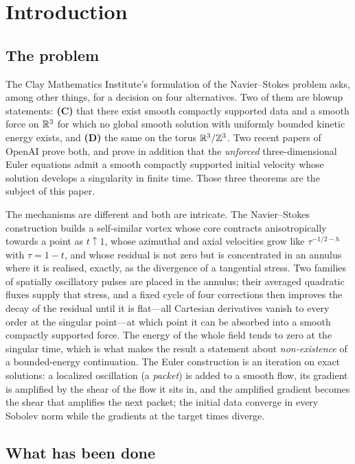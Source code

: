 \section{Introduction}
\label{sec:intro}

\subsection{The problem}

The Clay Mathematics Institute's formulation of the Navier--Stokes problem
\cite{clay} asks, among other things, for a decision on four alternatives. Two of them are
blowup statements: \textbf{(C)} that there exist smooth compactly supported data and a
smooth force on $\mathbb{R}^3$ for which no global smooth solution with uniformly bounded kinetic
energy exists, and \textbf{(D)} the same on the torus $\mathbb{R}^3/\mathbb{Z}^3$. Two recent papers of
OpenAI \cite{ns-paper,euler-paper} prove both, and prove in addition that the
\emph{unforced} three-dimensional Euler equations admit a smooth compactly supported
initial velocity whose solution develops a singularity in finite time. Those three
theorems are the subject of this paper.

The mechanisms are different and both are intricate. The Navier--Stokes construction builds
a self-similar vortex whose core contracts anisotropically towards a point as $t\uparrow1$,
whose azimuthal and axial velocities grow like $\tau^{-1/2-h}$ with $\tau=1-t$, and whose
residual is not zero but is concentrated in an annulus where it is realised, exactly, as
the divergence of a tangential stress. Two families of spatially oscillatory pulses are
placed in the annulus; their averaged quadratic fluxes supply that stress, and a fixed
cycle of four corrections then improves the decay of the residual until it is flat---all
Cartesian derivatives vanish to every order at the singular point---at which point it can be
absorbed into a smooth compactly supported force. The energy of the whole field tends to
zero at the singular time, which is what makes the result a statement about
\emph{non-existence} of a bounded-energy continuation. The Euler construction is an
iteration on exact solutions: a localized oscillation (a \emph{packet}) is added to a
smooth flow, its gradient is amplified by the shear of the flow it sits in, and the
amplified gradient becomes the shear that amplifies the next packet; the initial data
converge in every Sobolev norm while the gradients at the target times diverge.

\subsection{What has been done}

